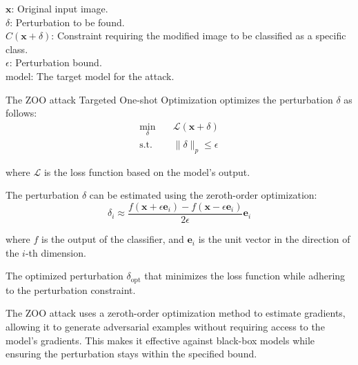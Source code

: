 \textbf{$\mathbf{x}$}: Original input image. \\
\textbf{$\delta$}: Perturbation to be found. \\
\textbf{$C(\mathbf{x} + \delta)$}: Constraint requiring the modified image to be classified as a specific class. \\
\textbf{$\epsilon$}: Perturbation bound. \\
\textbf{$\text{model}$}: The target model for the attack.

The ZOO attack Targeted One-shot Optimization optimizes the perturbation $\delta$ as follows:
\begin{equation*}
\begin{aligned}
\min_{\delta} & \quad \mathcal{L}(\mathbf{x} + \delta) \\
\text{s.t.} & \quad \|\delta\|_p \leq \epsilon
\end{aligned}
\end{equation*}

where $\mathcal{L}$ is the loss function based on the model's output.

The perturbation $\delta$ can be estimated using the zeroth-order optimization:
\begin{equation*}
\delta_i \approx \frac{f(\mathbf{x} + \epsilon \mathbf{e}_i) - f(\mathbf{x} - \epsilon \mathbf{e}_i)}{2 \epsilon} \mathbf{e}_i
\end{equation*}

where $f$ is the output of the classifier, and $\mathbf{e}_i$ is the unit vector in the direction of the $i$-th dimension.

The optimized perturbation $\delta_{\text{opt}}$ that minimizes the loss function while adhering to the perturbation constraint.

The ZOO attack uses a zeroth-order optimization method to estimate gradients, allowing it to generate adversarial examples without requiring access to the model's gradients. This makes it effective against black-box models while ensuring the perturbation stays within the specified bound.
